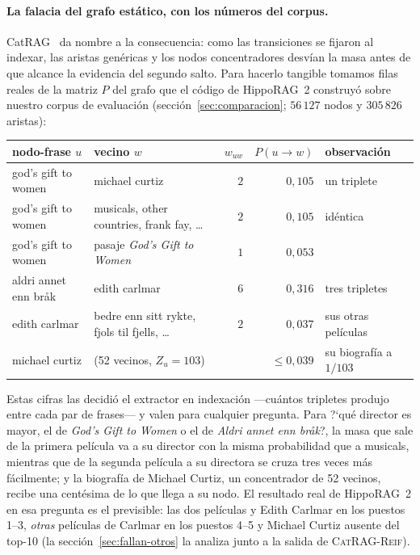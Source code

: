\documentclass[11pt,a4paper]{article}
\newcommand{\sys}{\textsc{CatRAG-Reif}}          %
\newcommand{\hippo}{HippoRAG~2}
\begin{document}
\paragraph{La falacia del grafo estático, con los números del corpus.}
CatRAG~\cite{catrag} da nombre a la consecuencia: como las transiciones
se fijaron al indexar, las aristas genéricas y los nodos concentradores
desvían la masa antes de que alcance la evidencia del segundo salto. Para
hacerlo tangible tomamos filas reales de la matriz $P$ del grafo que el
código de \hippo{} construyó sobre nuestro corpus de evaluación
(sección~\ref{sec:comparacion}; $56\,127$ nodos y $305\,826$ aristas):
\begin{center}\small\setlength{\tabcolsep}{4pt}
\begin{tabular}{llrrl}
\toprule
nodo-frase $u$ & vecino $w$ & $w_{uw}$ & $P(u\to w)$ & observación\\
\midrule
god's gift to women & michael curtiz & $2$ & $0{,}105$ & un triplete\\
god's gift to women & musicals, other countries, frank fay, \dots & $2$ & $0{,}105$ & idéntica\\
god's gift to women & pasaje \emph{God's Gift to Women} & $1$ & $0{,}053$ & \\
aldri annet enn bråk & edith carlmar & $6$ & $0{,}316$ & tres tripletes\\
edith carlmar & bedre enn sitt rykte, fjols til fjells, \dots & $2$ & $0{,}037$ & sus otras películas\\
michael curtiz & (52 vecinos, $Z_u=103$) & & $\le 0{,}039$ & su biografía a $1/103$\\
\bottomrule
\end{tabular}
\end{center}
Estas cifras las decidió el extractor en indexación ---cuántos tripletes
produjo entre cada par de frases--- y valen para cualquier pregunta. Para
\guillemotleft{}?`qué director es mayor, el de \emph{God's Gift to Women} o el de
\emph{Aldri annet enn bråk}?\guillemotright{}, la masa que sale de la primera película
va a su director con la misma probabilidad que a \guillemotleft{}musicals\guillemotright{},
mientras que de la segunda película a su directora se cruza tres veces
más fácilmente; y la biografía de Michael Curtiz, un concentrador de 52
vecinos, recibe una centésima de lo que llega a su nodo. El resultado
real de \hippo{} en esa pregunta es el previsible: las dos películas y
Edith Carlmar en los puestos 1--3, \emph{otras} películas de Carlmar en
los puestos 4--5 y Michael Curtiz ausente del top-10 (la
sección~\ref{sec:fallan-otros} la analiza junto a la salida de \sys{}).
\end{document}
